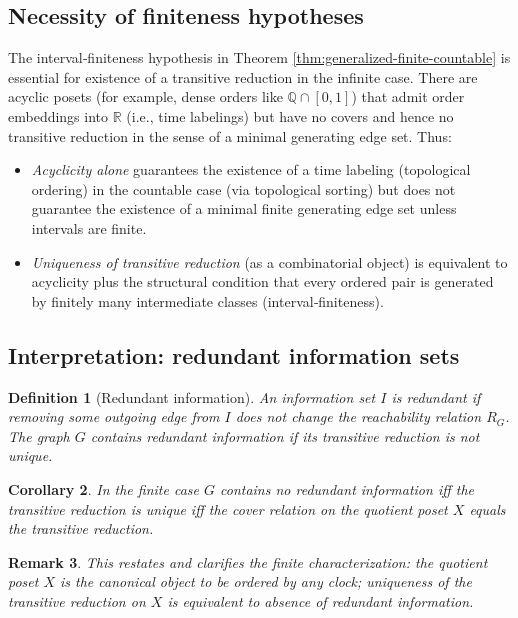 \documentclass[11pt]{article}
\newtheorem{definition}{Definition}[section]
\newtheorem{corollary}[definition]{Corollary}
\newtheorem{remark}[definition]{Remark}
\begin{document}
\subsection{Necessity of finiteness hypotheses}
The interval‑finiteness hypothesis in Theorem \ref{thm:generalized-finite-countable}
is essential for existence of a transitive reduction in the infinite
case. There are acyclic posets (for example, dense orders like
\(\mathbb Q\cap[0,1]\)) that admit order embeddings into \(\mathbb R\)
(i.e., time labelings) but have no covers and hence no transitive
reduction in the sense of a minimal generating edge set. Thus:
\begin{itemize}
  \item \emph{Acyclicity alone} guarantees the existence of a time
    labeling (topological ordering) in the countable case (via topological
    sorting) but does not guarantee the existence of a minimal finite
    generating edge set unless intervals are finite.
  \item \emph{Uniqueness of transitive reduction} (as a combinatorial
    object) is equivalent to acyclicity plus the structural condition
    that every ordered pair is generated by finitely many intermediate
    classes (interval‑finiteness).
\end{itemize}



\subsection{Interpretation: redundant information sets}
\begin{definition}[Redundant information]
An information set \(I\) is \emph{redundant} if removing some outgoing
edge from \(I\) does not change the reachability relation \(R_G\). The
graph \(G\) \emph{contains redundant information} if its transitive
reduction is not unique.
\end{definition}

\begin{corollary}
In the finite case \(G\) contains no redundant information iff the
transitive reduction is unique iff the cover relation on the quotient
poset \(X\) equals the transitive reduction.
\end{corollary}

\begin{remark}
This restates and clarifies the finite characterization: the quotient
poset \(X\) is the canonical object to be ordered by any clock; uniqueness
of the transitive reduction on \(X\) is equivalent to absence of
redundant information.
\end{remark}
\end{document}
